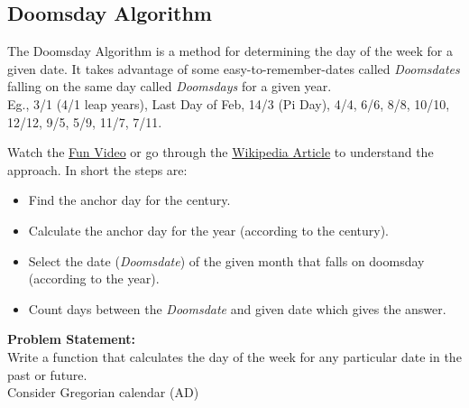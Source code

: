 \subsection{Doomsday Algorithm}
The Doomsday Algorithm is a method for determining the day of the week for a given date. It  takes advantage of some easy-to-remember-dates called \emph{Doomsdates} falling on the same day called \emph{Doomsdays} for a given year.\\
Eg., 3/1 (4/1 leap years), Last Day of Feb, 14/3 (Pi Day), 4/4, 6/6, 8/8, 10/10, 12/12, 9/5, 5/9, 11/7, 7/11.

Watch the \href{https://youtu.be/z2x3SSBVGJU}{Fun Video} or go through the \href{https://en.wikipedia.org/wiki/Doomsday_rule}{Wikipedia Article} to understand the approach. In short the steps are:
\begin{itemize}
\item Find the anchor day for the century.
\item Calculate the anchor day for the year (according to the century).
\item Select the date (\emph{Doomsdate}) of the given month that falls on doomsday (according to the year).
\item Count days between the \emph{Doomsdate} and given date which gives the answer.
\end{itemize}
\textbf{Problem Statement:}\\
Write a function that calculates the day of the week for any particular date in the past or future.\\
Consider Gregorian calendar (AD)
